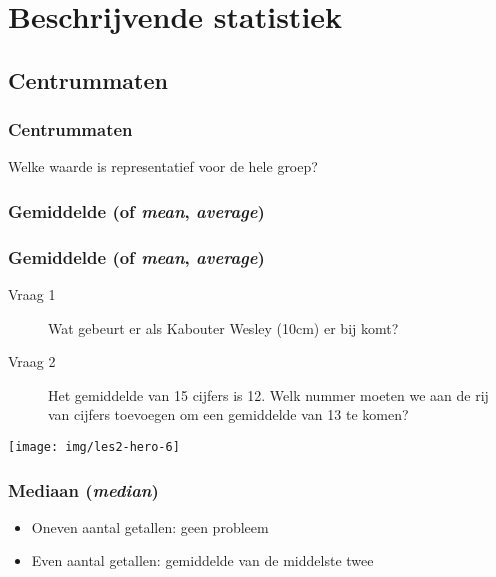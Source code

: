 \documentclass[aspectratio=169]{beamer}
\begin{document}
\section{Beschrijvende statistiek}

\subsection{Centrummaten}

\begin{frame}
  \frametitle{Centrummaten}
  
  \Large Welke waarde is representatief voor de hele groep?
\end{frame}

\begin{frame}
  \frametitle{Gemiddelde (of \emph{mean}, \emph{average})}


  

\end{frame}

\begin{frame}
\frametitle{Gemiddelde (of \emph{mean}, \emph{average})}


  \vspace{.5cm}
  \begin{description}
    \item[Vraag 1] Wat gebeurt er als Kabouter Wesley (10cm) er bij komt?
    \item[Vraag 2] Het gemiddelde van 15 cijfers is 12. Welk nummer moeten we aan de rij van cijfers toevoegen om een gemiddelde van 13 te komen?
  \end{description}

  \centering \texttt{[image: img/les2-hero-6]}

\end{frame}

\begin{frame}
  \frametitle{Mediaan (\emph{median})}


  \begin{itemize}
    \item Oneven aantal getallen: geen probleem
    \item Even aantal getallen: gemiddelde van de middelste twee
  \end{itemize}

  

\end{frame}
\end{document}
